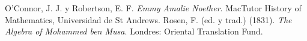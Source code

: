 \documentclass[11pt]{article}
\begin{document}
\begin{referencias}
 O'Connor, J. J. y Robertson, E. F. \emph{Emmy
  Amalie Noether}. MacTutor History of Mathematics, Universidad de St
  Andrews.
 Rosen, F. (ed. y trad.) (1831). \emph{The Algebra of
  Mohammed ben Musa}. Londres: Oriental Translation Fund.
\end{referencias}
\end{document}
